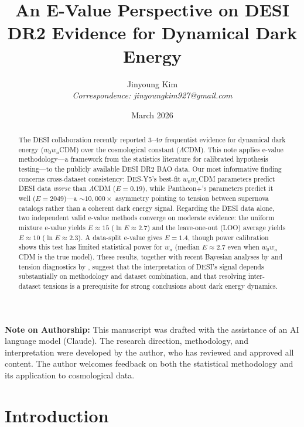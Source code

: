 \documentclass[11pt,a4paper]{article}
\title{An E-Value Perspective on DESI DR2 Evidence for Dynamical Dark Energy}
\author{
Jinyoung Kim\\
\small \textit{Correspondence: jinyoungkim927@gmail.com}
}
\date{March 2026}
\newcommand{\LCDM}{$\Lambda$CDM}
\begin{document}
\maketitle

\begin{abstract}
The DESI collaboration recently reported 3--4$\sigma$ frequentist evidence for dynamical dark energy ($w_0w_a$CDM) over the cosmological constant (\LCDM). This note applies e-value methodology---a framework from the statistics literature for calibrated hypothesis testing---to the publicly available DESI DR2 BAO data. Our most informative finding concerns cross-dataset consistency: DES-Y5's best-fit $w_0w_a$CDM parameters predict DESI data \textit{worse} than \LCDM{} ($E = 0.19$), while Pantheon+'s parameters predict it well ($E = 2049$)---a ${\sim}10{,}000\times$ asymmetry pointing to tension between supernova catalogs rather than a coherent dark energy signal. Regarding the DESI data alone, two independent valid e-value methods converge on moderate evidence: the uniform mixture e-value yields $E \approx 15$ ($\ln E \approx 2.7$) and the leave-one-out (LOO) average yields $E \approx 10$ ($\ln E \approx 2.3$). A data-split e-value gives $E = 1.4$, though power calibration shows this test has limited statistical power for $w_a$ (median $E \approx 2.7$ even when $w_0w_a$CDM is the true model). These results, together with recent Bayesian analyses by \citet{OngBayesian2025} and tension diagnostics by \citet{WangMota2025}, suggest that the interpretation of DESI's signal depends substantially on methodology and dataset combination, and that resolving inter-dataset tensions is a prerequisite for strong conclusions about dark energy dynamics.
\end{abstract}

\vspace{1em}
\noindent\textbf{Note on Authorship:} This manuscript was drafted with the assistance of an AI language model (Claude). The research direction, methodology, and interpretation were developed by the author, who has reviewed and approved all content. The author welcomes feedback on both the statistical methodology and its application to cosmological data.

\tableofcontents
\newpage

\section{Introduction}
\label{sec:intro}
\end{document}
